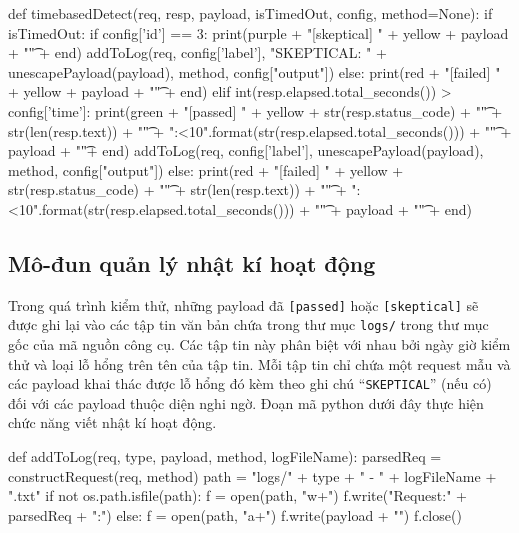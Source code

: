 \begin{python}
def timebasedDetect(req, resp, payload, isTimedOut, config, method=None):
    if isTimedOut:
        if config['id'] == 3:
            print(purple + "[skeptical]    " + yellow + payload + "\t" + end)
            addToLog(req, config['label'], "SKEPTICAL: " + unescapePayload(payload), method, config["output"])
    else:
        print(red + "[failed]    " + yellow + payload + "\t" +  end)
    elif int(resp.elapsed.total_seconds()) > config['time']:
        print(green + "[passed]    " + yellow + str(resp.status_code) + "\t" + str(len(resp.text)) + "\t" + "{:<10}".format(str(resp.elapsed.total_seconds())) + "\t" +  payload + "\t"+ end)
        addToLog(req, config['label'], unescapePayload(payload), method, config["output"])
    else:
        print(red + "[failed]    " + yellow + str(resp.status_code) + "\t" + str(len(resp.text)) + "\t" + "{:<10}".format(str(resp.elapsed.total_seconds())) + "\t" +  payload + "\t" +  end)
\end{python}

\subsection{Mô-đun quản lý nhật kí hoạt động}
Trong quá trình kiểm thử, những payload đã \texttt{[passed]} hoặc \texttt{[skeptical]} sẽ được ghi lại vào các tập tin văn bản chứa trong thư mục \texttt{logs/} trong thư mục gốc của mã nguồn công cụ. Các tập tin này phân biệt với nhau bởi ngày giờ kiểm thử và loại lỗ hổng trên tên của tập tin. Mỗi tập tin chỉ chứa một request mẫu và các payload khai thác được lỗ hổng đó kèm theo ghi chú ``\texttt{SKEPTICAL}'' (nếu có) đối với các payload thuộc diện nghi ngờ. Đoạn mã python dưới đây thực hiện chức năng viết nhật kí hoạt động.\\
\begin{python}
def addToLog(req, type, payload, method, logFileName):
    parsedReq = constructRequest(req, method)
    path = "logs/" + type + " - " + logFileName + ".txt"
    if not os.path.isfile(path):
        f = open(path, "w+")
        f.write("Request:\n" + parsedReq + "\n\nPayload:\n")
    else:
        f = open(path, "a+")
    f.write(payload + "\n")
    f.close()
\end{python}

